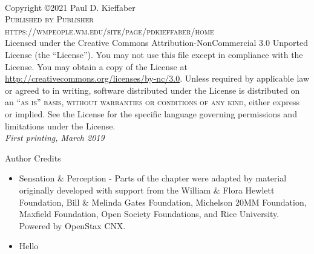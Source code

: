 \documentclass[12pt]{book} %
\begin{document}

\newpage
~\vfill
\thispagestyle{empty}

\noindent Copyright \copyright  2021 Paul D. Kieffaber\\ %

\noindent \textsc{Published by Publisher} \\ %

\noindent \textsc{https://wmpeople.wm.edu/site/page/pdkieffaber/home}\\ %

\noindent Licensed under the Creative Commons Attribution-NonCommercial 3.0 Unported License (the ``License''). You may not use this file except in compliance with the License. You may obtain a copy of the License at \url{http://creativecommons.org/licenses/by-nc/3.0}. Unless required by applicable law or agreed to in writing, software distributed under the License is distributed on an \textsc{``as is'' basis, without warranties or conditions of any kind}, either express or implied. See the License for the specific language governing permissions and limitations under the License.\\ %

\noindent \textit{First printing, March 2019} %

\newpage
\thispagestyle{empty}
\begin{center}Author Credits\end{center}
\begin{itemize}
    \item Sensation \& Perception - Parts of the chapter were adapted by material originally developed with support from the William \& Flora Hewlett Foundation, Bill \& Melinda Gates Foundation, Michelson 20MM Foundation, Maxfield Foundation, Open Society Foundations, and Rice University. Powered by OpenStax CNX.
    \item Hello
\end{itemize}



\end{document}
